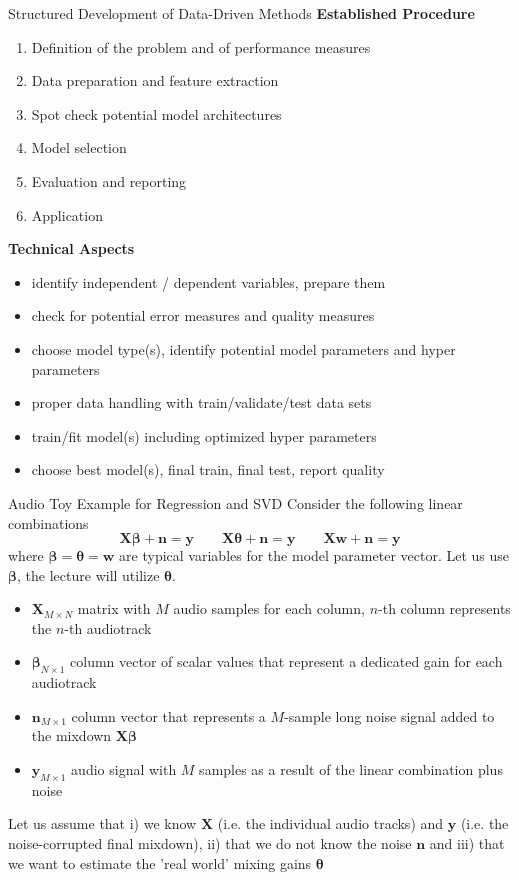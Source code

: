 \documentclass[mathserif, aspectratio=43]{intbeamer}
\begin{document}
\begin{frame}{Structured Development of Data-Driven Methods}
\textbf{Established Procedure}
\begin{enumerate}
\item Definition of the problem and of performance measures
\item Data preparation and feature extraction
\item Spot check potential model architectures
\item Model selection
\item Evaluation and reporting
\item Application
\end{enumerate}
\textbf{Technical Aspects}
\begin{itemize}
\item identify independent / dependent variables, prepare them
\item check for potential error measures and quality measures
\item choose model type(s), identify potential model parameters and hyper parameters
\item proper data handling with train/validate/test data sets
\item train/fit model(s) including optimized hyper parameters
\item choose best model(s), final train, final test, report quality
\end{itemize}
\end{frame}




\begin{frame}{Audio Toy Example for Regression and SVD}
Consider the following linear combinations
$$\bm{X} \bm{\beta} + \bm{n} = \bm{y}\qquad
\bm{X} \bm{\theta} + \bm{n} = \bm{y}\qquad
\bm{X} \bm{w} + \bm{n} = \bm{y}$$
where $\bm{\beta}=\bm{\theta} = \bm{w}$ are typical variables for the model parameter vector. Let us use $\bm{\beta}$, the lecture will utilize $\bm{\theta}$.
%
\begin{itemize}
\item $\bm{X}_{M \times N}$ matrix with $M$ audio samples for each column, $n$-th column represents the $n$-th audiotrack
\item $\bm{\beta}_{N \times 1}$ column vector of scalar values that represent a dedicated gain for each audiotrack
\item $\bm{n}_{M \times 1}$ column vector that represents a $M$-sample long noise signal added to the mixdown $\bm{X} \bm{\beta}$
\item $\bm{y}_{M \times 1}$ audio signal with $M$ samples as a result of the linear combination plus noise
\end{itemize}
%
Let us assume that i) we know $\bm{X}$ (i.e. the individual audio tracks) and $\bm{y}$ (i.e. the noise-corrupted final mixdown), ii) that we do not know the noise $\bm{n}$ and iii) that we want to estimate the 'real world' mixing gains $\bm{\theta}$
\end{frame}
\end{document}
